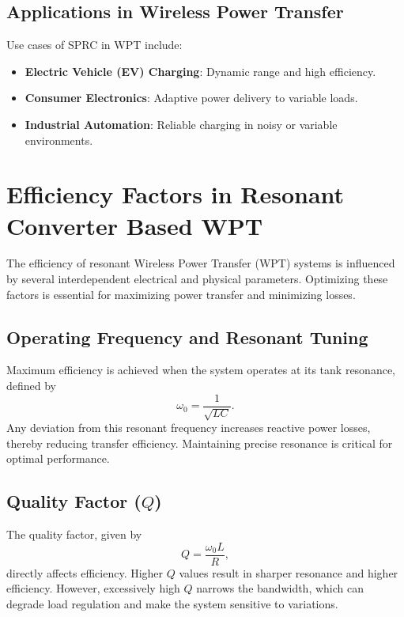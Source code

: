 \documentclass[12pt,a4paper]{report}
\begin{document}
\section{Applications in Wireless Power Transfer}



Use cases of SPRC in WPT include:

\begin{itemize}
    \item \textbf{Electric Vehicle (EV) Charging}: Dynamic range and high efficiency.
    \item \textbf{Consumer Electronics}: Adaptive power delivery to variable loads.
    \item \textbf{Industrial Automation}: Reliable charging in noisy or variable environments.\cite{irivennela2020wireless}
\end{itemize}


 

\chapter{Efficiency Factors in Resonant Converter Based WPT}
\vspace{1cm}

The efficiency of resonant Wireless Power Transfer (WPT) systems is influenced by several interdependent electrical and physical parameters. Optimizing these factors is essential for maximizing power transfer and minimizing losses.

\section{Operating Frequency and Resonant Tuning}  
Maximum efficiency is achieved when the system operates at its tank resonance, defined by 
\[
\omega_0 = \frac{1}{\sqrt{LC}}.
\] 
Any deviation from this resonant frequency increases reactive power losses, thereby reducing transfer efficiency. Maintaining precise resonance is critical for optimal performance.\cite{irivennela2020wireless}

\section{Quality Factor (\(Q\))}  
The quality factor, given by 
\[
Q = \frac{\omega_0 L}{R},
\] 
directly affects efficiency. Higher \(Q\) values result in sharper resonance and higher efficiency. However, excessively high \(Q\) narrows the bandwidth, which can degrade load regulation and make the system sensitive to variations.\cite{choi2020resonant}
\end{document}
